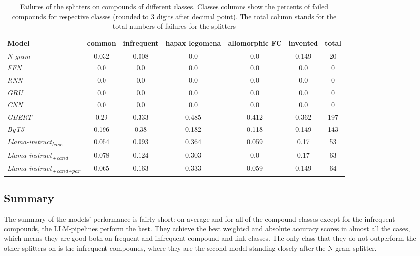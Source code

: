 \documentclass[11pt]{article}
\begin{document}
\begin{table}[htb!]
    \centering
    \begin{tabular}{@{}lcccccc@{}}
        \toprule
        Model & common & infrequent & hapax legomena & allomorphic FC & invented & total \\ \midrule
        \textit{N-gram} & 0.032 & 0.008 & 0.0 & 0.0 & 0.149 & 20 \\ \cmidrule{1-7}
        \textit{FFN} & 0.0 & 0.0 & 0.0 & 0.0 & 0.0 & 0 \\
        \textit{RNN} & 0.0 & 0.0 & 0.0 & 0.0 & 0.0 & 0 \\
        \textit{GRU} & 0.0 & 0.0 & 0.0 & 0.0 & 0.0 & 0 \\
        \textit{CNN} & 0.0 & 0.0 & 0.0 & 0.0 & 0.0 & 0 \\ \cmidrule{1-7}
        \textit{GBERT} & 0.29 & 0.333 & 0.485 & 0.412 & 0.362 & 197 \\
        \textit{ByT5} & 0.196 & 0.38 & 0.182 & 0.118 & 0.149 & 143 \\ \midrule
        \textit{Llama-instruct\textsubscript{base}} & 0.054 & 0.093 & 0.364 & 0.059 & 0.17 & 53 \\
        \textit{Llama-instruct\textsubscript{+cand}} & 0.078 & 0.124 & 0.303 & 0.0 & 0.17 & 63 \\
        \textit{Llama-instruct\textsubscript{+cand+par}} & 0.065 & 0.163 & 0.333 & 0.059 & 0.149 & 64 \\
        \bottomrule
    \end{tabular}
    \caption{Failures of the splitters on compounds of different classes. Classes columns show the percents of failed compounds for respective classes (rounded to 3 digits after decimal point). The total column stands for the total numbers of failures for the splitters}
    \label{tab:failures}
\end{table}


\subsection{Summary}

The summary of the models' performance is fairly short: on average and for all of the compound classes except for the infrequent compounds, the LLM-pipelines perform the best. They achieve the best weighted and absolute accuracy scores in almost all the cases, which means they are good both on frequent and infrequent compound and link classes. The only class that they do not outperform the other splitters on is the infrequent compounds, where they are the second model standing closely after the N-gram splitter.
\end{document}
